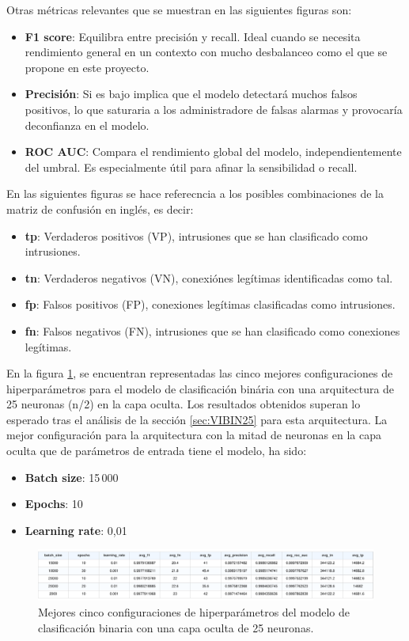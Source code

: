 Otras métricas relevantes que se muestran en las siguientes figuras son:
\begin{itemize}
	\item \textbf{F1 score}: Equilibra entre precisión y recall. Ideal cuando se necesita rendimiento general en un contexto con mucho desbalanceo como el que se propone en este proyecto.
	\item \textbf{Precisión}: Si es bajo implica que el modelo detectará muchos falsos positivos, lo que saturaria a los administradore de falsas alarmas y provocaría deconfianza en el modelo.
	\item \textbf{ROC AUC}: Compara el rendimiento global del modelo, independientemente del umbral. Es especialmente útil para afinar la sensibilidad o recall.
\end{itemize}

En las siguientes figuras se hace referecncia a los posibles combinaciones de la matriz de confusión en inglés, es decir:
\begin{itemize}
	\item \textbf{tp}: Verdaderos positivos (VP), intrusiones que se han clasificado como intrusiones.
	\item \textbf{tn}: Verdaderos negativos (VN), conexiónes legítimas identificadas como tal.
	\item \textbf{fp}: Falsos positivos (FP), conexiones legítimas clasificadas como intrusiones.
	\item \textbf{fn}: Falsos negativos (FN), intrusiones que se han clasificado como conexiones legítimas.
\end{itemize}

En la figura \ref{fig:BINhs25}, se encuentran representadas las cinco mejores configuraciones de hiperparámetros para el modelo de clasificación binária con una arquitectura de 25 neuronas (n/2) en la capa oculta. Los resultados obtenidos superan lo esperado tras el análisis de la sección \ref{sec:VIBIN25} para esta arquitectura. La mejor configuración para la arquitectura con la mitad de neuronas en la capa oculta que de parámetros de entrada tiene el modelo, ha sido:
\begin{itemize}
	\item \textbf{Batch size}: 15\,000
	\item \textbf{Epochs}: 10
	\item \textbf{Learning rate}: 0,01
\end{itemize}

\begin{figure}[H]
    \centering
    \includegraphics[width=1\textwidth]{./img/modelo/BINhs25.pdf}
    \caption{Mejores cinco configuraciones de hiperparámetros del modelo de clasificación binaria con una capa oculta de 25 neuronas.}
    \label{fig:BINhs25}
\end{figure}



